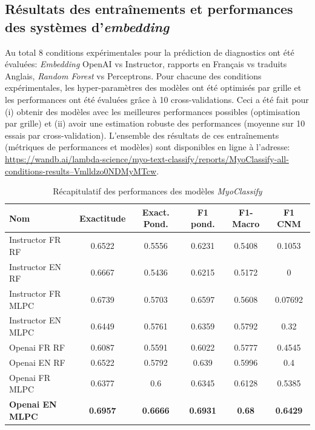 \subsection{Résultats des entraînements et performances des systèmes d'\textit{embedding}}
Au total 8 conditions expérimentales pour la prédiction de diagnostics ont été évaluées: \textit{Embedding} OpenAI vs Instructor, rapports en Français vs traduits Anglais, \textit{Random Forest} vs Perceptrons. Pour chacune des conditions expérimentales, les hyper-paramètres des modèles ont été optimisés par grille et les performances ont été évaluées grâce à 10 cross-validations. Ceci a été fait pour (i) obtenir des modèles avec les meilleures performances possibles (optimisation par grille) et (ii) avoir une estimation robuste des performances (moyenne sur 10 essais par cross-validation). L'ensemble des résultats de ces entraînements (métriques de performances et modèles) sont disponibles en ligne à l'adresse: \href{https://wandb.ai/lambda-science/myo-text-classify/reports/MyoClassify-all-conditions-results--Vmlldzo0NDMyMTcw}{https://wandb.ai/lambda-science/myo-text-classify/reports/MyoClassify-all-conditions-results--Vmlldzo0NDMyMTcw}. 
\begin{table}[!ht]
\centering
\caption{Récapitulatif des performances des modèles \textit{MyoClassify}}
\label{tab:myoclassify_metrics}
\begin{tabularx}{\textwidth}{|X|c|c|c|c|c|}
\hline
\textbf{Nom} & \textbf{Exactitude} & \textbf{Exact. Pond.} & \textbf{F1 pond.} & \textbf{F1-Macro} & \textbf{F1 CNM} \\\hline
Instructor FR RF & 0.6522 & 0.5556 & 0.6231 & 0.5408 & 0.1053 \\ \hline
Instructor EN RF & 0.6667 & 0.5436 & 0.6215 & 0.5172 & 0 \\ \hline
Instructor FR MLPC & 0.6739 & 0.5703 & 0.6597 & 0.5608 & 0.07692 \\ \hline
Instructor EN MLPC & 0.6449 & 0.5761 & 0.6359 & 0.5792 & 0.32 \\ \hline
Openai FR RF & 0.6087 & 0.5591 & 0.6022 & 0.5777 & 0.4545 \\ \hline
Openai EN RF & 0.6522 & 0.5792 & 0.639 & 0.5996 & 0.4 \\ \hline
Openai FR MLPC & 0.6377 & 0.6 & 0.6345 & 0.6128 & 0.5385 \\ \hline
\textbf{Openai EN MLPC} & \textbf{0.6957} &\textbf{0.6666}& \textbf{0.6931} &\textbf{ 0.68} & \textbf{0.6429} \\ \hline
\end{tabularx}
\end{table}
